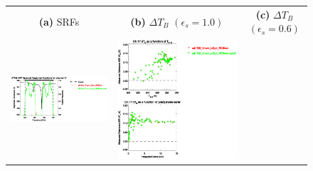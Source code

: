 \begin{figure}[H]
  \centering
  \begin{tabular}{c c c}
    \textsf{\textbf{(a)} SRFs} &
    \textsf{\textbf{(b)} $\Delta T_B$ $(\epsilon_s = 1.0)$} &
    \textsf{\textbf{(c)} $\Delta T_B$ $(\epsilon_s = 0.6)$} \\
    \includegraphics[bb=80 400 280 558,clip,scale=0.85]{graphics/srf/Rset/atms_npp.ch17.osrf.eps} &
    \includegraphics[bb=85 400 260 558,clip,scale=0.85]{graphics/dtb/Rset/e1.0_r0.0/atms_npp.ch17.dTb.eps} & 

\end{tabular}
\end{figure}
